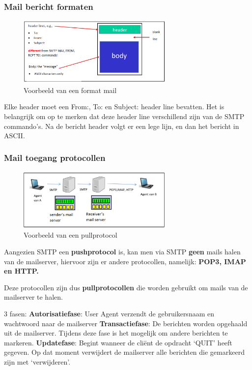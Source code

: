 \subsubsection{Mail bericht formaten}

\begin{figure}[h]
\centering
\includegraphics[width=3in]{./img/imghfdst2/formatmail.PNG}
\caption{Voorbeeld van een format mail }
\label{fig:format mail}
\end{figure}

\noindent Elke header moet een From:, To: en Subject: header line bevatten. Het is belangrijk om op te merken dat deze header line verschillend zijn van de SMTP commando’s. Na de bericht header volgt er een lege lijn, en dan het bericht in ASCII.

\subsubsection{Mail toegang protocollen}

\begin{figure}[h]
\centering
\includegraphics[width=3in]{./img/imghfdst2/access.PNG}
\caption{Voorbeeld van een pullprotocol }
\label{fig:pullprotocol}
\end{figure}

\noindent Aangezien SMTP een \textbf{pushprotocol} is, kan men via SMTP \textbf{geen} mails halen van de mailserver, hiervoor zijn er andere protocollen, namelijk: \textbf{POP3, IMAP en HTTP.}

\noindent Deze protocollen zijn dus \textbf{pullprotocollen} die worden gebruikt om mails van de mailserver te halen.

%


3 fasen:
\be
\itf \textbf{Autorisatiefase}: User Agent verzendt de gebruikersnaam en wachtwoord naar de mailserver
\itf \textbf{Transactiefase}: De berichten worden opgehaald uit de mailserver. Tijdens deze fase is het mogelijk om andere berichten te markeren.
\itf \textbf{Updatefase}: Begint wanneer de cliënt de opdracht ‘QUIT’ heeft gegeven. Op dat moment verwijdert de mailserver alle berichten die gemarkeerd zijn met ‘verwijderen’.
\ee

